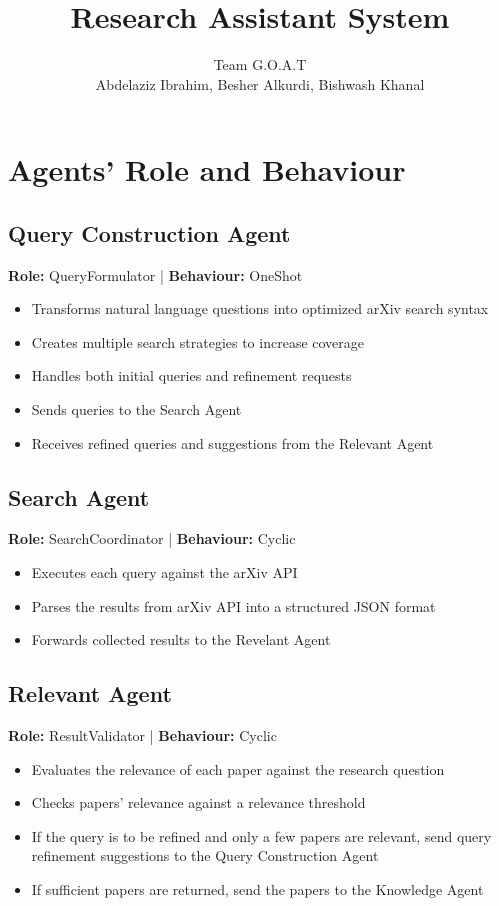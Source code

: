 \documentclass{article}
\title{Research Assistant System}
\author{Team G.O.A.T\\
Abdelaziz Ibrahim, Besher Alkurdi, Bishwash Khanal}
\date{}
\begin{document}
\maketitle

\section{Agents' Role and Behaviour}

\subsection{Query Construction Agent}

\textbf{Role:} QueryFormulator | \textbf{Behaviour:} OneShot

\begin{itemize}
  \item Transforms natural language questions into optimized arXiv search syntax
  \item Creates multiple search strategies to increase coverage
  \item Handles both initial queries and refinement requests
  \item Sends queries to the Search Agent
  \item Receives refined queries and suggestions from the Relevant Agent
\end{itemize}

\subsection{Search Agent}

\textbf{Role:} SearchCoordinator | \textbf{Behaviour:} Cyclic

\begin{itemize}
  \item Executes each query against the arXiv API
  \item Parses the results from arXiv API into a structured JSON format
  \item Forwards collected results to the Revelant Agent
\end{itemize}

\subsection{Relevant Agent}

\textbf{Role:} ResultValidator | \textbf{Behaviour:} Cyclic

\begin{itemize}
  \item Evaluates the relevance of each paper against the research question
  \item Checks papers' relevance against a relevance threshold
  \item If the query is to be refined and only a few papers are relevant, send query refinement suggestions to the Query Construction Agent
  \item If sufficient papers are returned, send the papers to the Knowledge Agent
\end{itemize}
\end{document}
